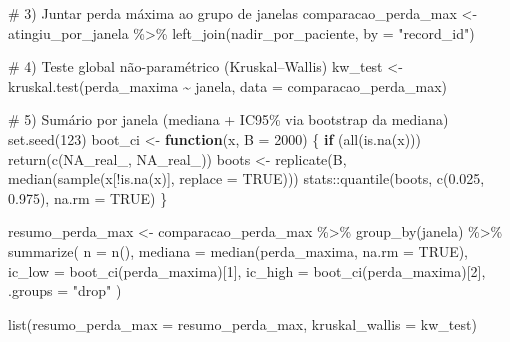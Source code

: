 \documentclass[
]{article}
\newenvironment{Shaded}{\begin{snugshade}}{\end{snugshade}}
\newcommand{\AttributeTok}[1]{\textcolor[rgb]{0.40,0.45,0.13}{#1}}
\newcommand{\CommentTok}[1]{\textcolor[rgb]{0.37,0.37,0.37}{#1}}
\newcommand{\ConstantTok}[1]{\textcolor[rgb]{0.56,0.35,0.01}{#1}}
\newcommand{\ControlFlowTok}[1]{\textcolor[rgb]{0.00,0.23,0.31}{\textbf{#1}}}
\newcommand{\DecValTok}[1]{\textcolor[rgb]{0.68,0.00,0.00}{#1}}
\newcommand{\FloatTok}[1]{\textcolor[rgb]{0.68,0.00,0.00}{#1}}
\newcommand{\FunctionTok}[1]{\textcolor[rgb]{0.28,0.35,0.67}{#1}}
\newcommand{\NormalTok}[1]{\textcolor[rgb]{0.00,0.23,0.31}{#1}}
\newcommand{\OtherTok}[1]{\textcolor[rgb]{0.00,0.23,0.31}{#1}}
\newcommand{\SpecialCharTok}[1]{\textcolor[rgb]{0.37,0.37,0.37}{#1}}
\newcommand{\StringTok}[1]{\textcolor[rgb]{0.13,0.47,0.30}{#1}}
\begin{document}
\begin{Shaded}
\begin{Highlighting}[]
\CommentTok{\# 3) Juntar perda máxima ao grupo de janelas}
\NormalTok{comparacao\_perda\_max }\OtherTok{\textless{}{-}}\NormalTok{ atingiu\_por\_janela }\SpecialCharTok{\%\textgreater{}\%}
  \FunctionTok{left\_join}\NormalTok{(nadir\_por\_paciente, }\AttributeTok{by =} \StringTok{"record\_id"}\NormalTok{)}

\CommentTok{\# 4) Teste global não{-}paramétrico (Kruskal–Wallis)}
\NormalTok{kw\_test }\OtherTok{\textless{}{-}} \FunctionTok{kruskal.test}\NormalTok{(perda\_maxima }\SpecialCharTok{\textasciitilde{}}\NormalTok{ janela, }\AttributeTok{data =}\NormalTok{ comparacao\_perda\_max)}

\CommentTok{\# 5) Sumário por janela (mediana + IC95\% via bootstrap da mediana)}
\FunctionTok{set.seed}\NormalTok{(}\DecValTok{123}\NormalTok{)}
\NormalTok{boot\_ci }\OtherTok{\textless{}{-}} \ControlFlowTok{function}\NormalTok{(x, }\AttributeTok{B =} \DecValTok{2000}\NormalTok{) \{}
  \ControlFlowTok{if}\NormalTok{ (}\FunctionTok{all}\NormalTok{(}\FunctionTok{is.na}\NormalTok{(x))) }\FunctionTok{return}\NormalTok{(}\FunctionTok{c}\NormalTok{(}\ConstantTok{NA\_real\_}\NormalTok{, }\ConstantTok{NA\_real\_}\NormalTok{))}
\NormalTok{  boots }\OtherTok{\textless{}{-}} \FunctionTok{replicate}\NormalTok{(B, }\FunctionTok{median}\NormalTok{(}\FunctionTok{sample}\NormalTok{(x[}\SpecialCharTok{!}\FunctionTok{is.na}\NormalTok{(x)], }\AttributeTok{replace =} \ConstantTok{TRUE}\NormalTok{)))}
\NormalTok{  stats}\SpecialCharTok{::}\FunctionTok{quantile}\NormalTok{(boots, }\FunctionTok{c}\NormalTok{(}\FloatTok{0.025}\NormalTok{, }\FloatTok{0.975}\NormalTok{), }\AttributeTok{na.rm =} \ConstantTok{TRUE}\NormalTok{)}
\NormalTok{\}}

\NormalTok{resumo\_perda\_max }\OtherTok{\textless{}{-}}\NormalTok{ comparacao\_perda\_max }\SpecialCharTok{\%\textgreater{}\%}
  \FunctionTok{group\_by}\NormalTok{(janela) }\SpecialCharTok{\%\textgreater{}\%}
  \FunctionTok{summarize}\NormalTok{(}
    \AttributeTok{n =} \FunctionTok{n}\NormalTok{(),}
    \AttributeTok{mediana =} \FunctionTok{median}\NormalTok{(perda\_maxima, }\AttributeTok{na.rm =} \ConstantTok{TRUE}\NormalTok{),}
    \AttributeTok{ic\_low  =} \FunctionTok{boot\_ci}\NormalTok{(perda\_maxima)[}\DecValTok{1}\NormalTok{],}
    \AttributeTok{ic\_high =} \FunctionTok{boot\_ci}\NormalTok{(perda\_maxima)[}\DecValTok{2}\NormalTok{],}
    \AttributeTok{.groups =} \StringTok{"drop"}
\NormalTok{  )}

\FunctionTok{list}\NormalTok{(}\AttributeTok{resumo\_perda\_max =}\NormalTok{ resumo\_perda\_max, }\AttributeTok{kruskal\_wallis =}\NormalTok{ kw\_test)}
\end{Highlighting}
\end{Shaded}
\end{document}

